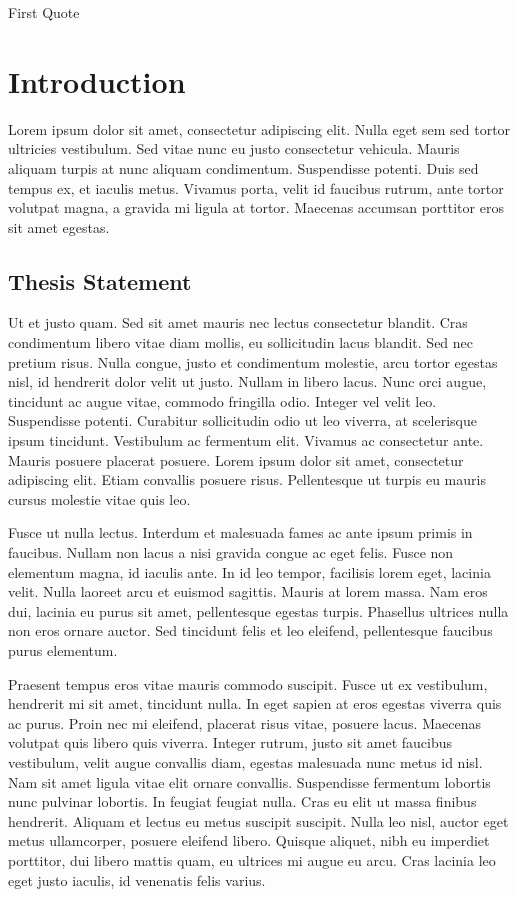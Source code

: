 \begin{savequote}[60mm] 
First Quote
\end{savequote}

\chapter{Introduction}

Lorem ipsum dolor sit amet, consectetur adipiscing elit. Nulla eget sem sed tortor ultricies vestibulum. Sed vitae nunc eu justo consectetur vehicula. Mauris aliquam turpis at nunc aliquam condimentum. Suspendisse potenti. Duis sed tempus ex, et iaculis metus. Vivamus porta, velit id faucibus rutrum, ante tortor volutpat magna, a gravida mi ligula at tortor. Maecenas accumsan porttitor eros sit amet egestas.

\section{Thesis Statement}

Ut et justo quam. Sed sit amet mauris nec lectus consectetur blandit. Cras condimentum libero vitae diam mollis, eu sollicitudin lacus blandit. Sed nec pretium risus. Nulla congue, justo et condimentum molestie, arcu tortor egestas nisl, id hendrerit dolor velit ut justo. Nullam in libero lacus. Nunc orci augue, tincidunt ac augue vitae, commodo fringilla odio. Integer vel velit leo. Suspendisse potenti. Curabitur sollicitudin odio ut leo viverra, at scelerisque ipsum tincidunt. Vestibulum ac fermentum elit. Vivamus ac consectetur ante. Mauris posuere placerat posuere. Lorem ipsum dolor sit amet, consectetur adipiscing elit. Etiam convallis posuere risus. Pellentesque ut turpis eu mauris cursus molestie vitae quis leo.

Fusce ut nulla lectus. Interdum et malesuada fames ac ante ipsum primis in faucibus. Nullam non lacus a nisi gravida congue ac eget felis. Fusce non elementum magna, id iaculis ante. In id leo tempor, facilisis lorem eget, lacinia velit. Nulla laoreet arcu et euismod sagittis. Mauris at lorem massa. Nam eros dui, lacinia eu purus sit amet, pellentesque egestas turpis. Phasellus ultrices nulla non eros ornare auctor. Sed tincidunt felis et leo eleifend, pellentesque faucibus purus elementum.

Praesent tempus eros vitae mauris commodo suscipit. Fusce ut ex vestibulum, hendrerit mi sit amet, tincidunt nulla. In eget sapien at eros egestas viverra quis ac purus. Proin nec mi eleifend, placerat risus vitae, posuere lacus. Maecenas volutpat quis libero quis viverra. Integer rutrum, justo sit amet faucibus vestibulum, velit augue convallis diam, egestas malesuada nunc metus id nisl. Nam sit amet ligula vitae elit ornare convallis. Suspendisse fermentum lobortis nunc pulvinar lobortis. In feugiat feugiat nulla. Cras eu elit ut massa finibus hendrerit. Aliquam et lectus eu metus suscipit suscipit. Nulla leo nisl, auctor eget metus ullamcorper, posuere eleifend libero. Quisque aliquet, nibh eu imperdiet porttitor, dui libero mattis quam, eu ultrices mi augue eu arcu. Cras lacinia leo eget justo iaculis, id venenatis felis varius.

